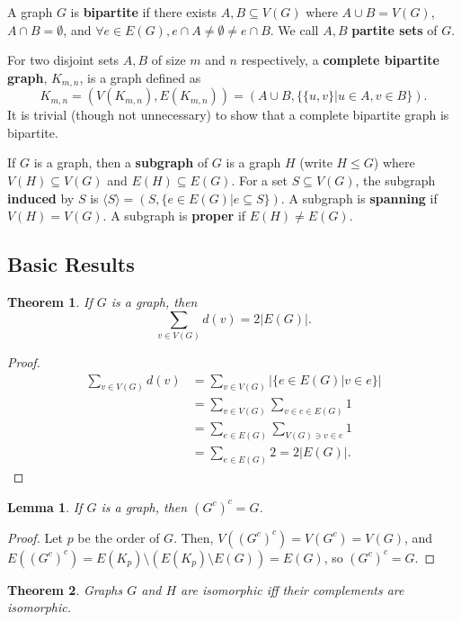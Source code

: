 \documentclass[a4paper,12pt]{article}
\newtheorem{theorem}{Theorem}
\newtheorem{lemma}{Lemma}
\begin{document}
A graph $G$ is {\bf bipartite} if there exists $A, B \subseteq V(G)$ where
$A \cup B = V(G)$, $A \cap B = \emptyset$, and
$\forall e \in E(G), e \cap A \neq \emptyset \neq e \cap B$.
We call $A, B$ {\bf partite sets} of $G$.

For two disjoint sets $A, B$ of size $m$ and $n$ respectively,
a {\bf complete bipartite graph}, $K_{m,n}$, is a graph defined as
\[ K_{m,n} = (V(K_{m,n}), E(K_{m,n})) = (A \cup B, \{\{u, v\} | u \in A, v \in B\}).\]
It is trivial (though not unnecessary)
to show that a complete bipartite graph is bipartite.

If $G$ is a graph, then a {\bf subgraph} of $G$ is a graph $H$ (write $H \leq G$)
where $V(H) \subseteq V(G)$ and $E(H) \subseteq E(G)$.
For a set $S \subseteq V(G)$, the subgraph {\bf induced} by $S$ is
$\langle S \rangle = (S, \{e \in E(G) | e \subseteq S\})$. A subgraph is
{\bf spanning} if $V(H) = V(G)$. A subgraph is {\bf proper} if $E(H) \neq E(G)$.

\subsection{Basic Results}

\begin{theorem}
If $G$ is a graph, then
\[\sum_{v \in V(G)} d(v) = 2|E(G)|.\]
\end{theorem}

\begin{proof}
\begin{align*}
\sum_{v \in V(G)} d(v)
& = \sum_{v \in V(G)} |\{e \in E(G) | v \in e \}| \\
& = \sum_{v \in V(G)} \sum_{v \in e \in E(G)} 1 \\
& = \sum_{e \in E(G)} \sum_{V(G) \ni v \in e} 1 \\
& = \sum_{e \in E(G)} 2
= 2 |E(G)|.
\end{align*}
\end{proof}

\begin{lemma}
If $G$ is a graph, then $(G^c)^c = G$.
\end{lemma}

\begin{proof}
Let $p$ be the order of $G$. Then,
$V((G^c)^c) = V(G^c) = V(G)$, and
$E((G^c)^c) = E(K_p) \setminus (E(K_p) \setminus E(G)) = E(G)$, so
$(G^c)^c = G$.
\end{proof}

\begin{theorem}
Graphs $G$ and $H$ are isomorphic iff their complements are isomorphic.
\end{theorem}
\end{document}
